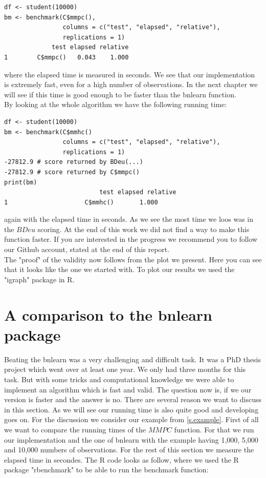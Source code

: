 		\begin{verbatim}
df <- student(10000)
bm <- benchmark(C$mmpc(),
                columns = c("test", "elapsed", "relative"),
                replications = 1)
             test elapsed relative
1        C$mmpc()   0.043    1.000
		\end{verbatim}
		
		where the elapsed time is measured in seconds. We see that our implementation is extremely fast, even for a high number of observations. In the next chapter we will see if this time is good enough to be faster than the bnlearn function.\\
		By looking at the whole algorithm we have the following running time:

		\begin{verbatim}
df <- student(10000)
bm <- benchmark(C$mmhc()
                columns = c("test", "elapsed", "relative"),
                replications = 1)
-27812.9 # score returned by BDeu(...)
-27812.9 # score returned by C$mmpc()
print(bm)
                          test elapsed relative
1                     C$mmhc()       1.000
		\end{verbatim}

		again with the elapsed time in seconds. As we see the most time we loos was in the $BDeu$ scoring. At the end of this work we did not find a way to make this function faster. If you are interested in the progress we recommend you to follow our Github account, stated at the end of this report.\\
		The "proof" of the validity now follows from the plot we present. Here you can see that it looks like the one we started with. To plot our results we used the "igraph" package in R.

		 \label{img.resultingGraph}

\chapter{A comparison to the bnlearn package}

	Beating the bnlearn was a very challenging and difficult task. It was a PhD thesis project which went over at least one year. We only had three months for this task. But with some tricks and computational knowledge we were able to implement an algorithm which is fast and valid. The question now is, if we our version is faster and the answer is no. There are several reason we want to discuss in this section. As we will see our running time is also quite good and developing goes on. For the discussion we consider our example from \autoref{s.example}. First of all we want to compare the running times of the $MMPC$ function. For that we run our implementation and the one of bnlearn with the example having 1,000, 5,000 and 10,000 numbers of observations. For the rest of this section we measure the elapsed time in secondes. The R code looks as follow, where we used the R package "rbenchmark" to be able to run the benchmark function:


